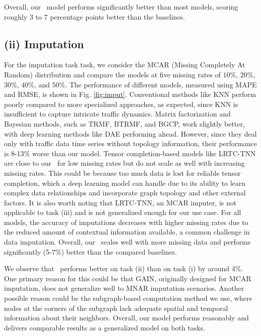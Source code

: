 Overall, our \name\ model performs significantly better than most models, scoring roughly 3 to 7 percentage points better than the baselines.

\subsection*{(ii) Imputation}

For the imputation task task, we consider the MCAR (Missing Completely At Random) distribution and compare the models at five missing rates of $10\%$, $20\%$, $30\%$, $40\%$, and $50\%$. The performance of different models, measured using MAPE and RMSE, is shown in Fig. \ref{fig:imput}. Conventional methods like KNN perform poorly compared to more specialized approaches, as expected, since KNN is insufficient to capture intricate traffic dynamics. Matrix factorization and Bayesian methods, such as TRMF, BTRMF, and BGCP, work slightly better, with deep learning methods like DAE performing ahead. However, since they deal only with traffic data time series without topology information, their performance is 8-13\% worse than our model. Tensor completion-based models like LRTC-TNN are close to our \name\ for low missing rates but do not scale as well with increasing missing rates. This could be because too much data is lost for reliable tensor completion, which a deep learning model can handle due to its ability to learn complex data relationships and incorporate graph topology and other external factors. It is also worth noting that LRTC-TNN, an MCAR imputer, is not applicable to task (iii) and is not generalized enough for our use case. For all models, the accuracy of imputations decreases with higher missing rates due to the reduced amount of contextual information available, a common challenge in data imputation. Overall, our \name\ scales well with more missing data and performs significantly (5-7\%) better than the compared baselines.

We observe that \name\ performs better on task (ii) than on task (i) by around 4\%. One primary reason for this could be that GAIN, originally designed for MCAR imputation, does not generalize well to MNAR imputation scenarios. Another possible reason could be the subgraph-based computation method we use, where nodes at the corners of the subgraph lack adequate spatial and temporal information about their neighbors. Overall, our model performs reasonably and delivers comparable results as a generalized model on both tasks.

